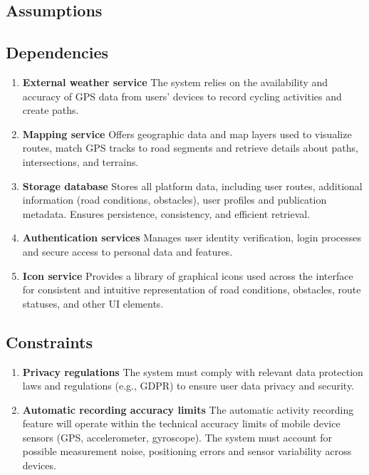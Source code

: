 \subsection{Assumptions}
\subsection{Dependencies}
    \begin{enumerate}[label=D\arabic*.]
        \item \textbf{External weather service} The system relies on the availability and accuracy of GPS data from users' devices to record cycling activities and create paths.
        \item \textbf{Mapping service} Offers geographic data and map layers used to visualize routes, match GPS tracks to road segments and retrieve details about paths, intersections, and terrains.
        \item \textbf{Storage database} Stores all platform data, including user routes, additional information (road conditions, obstacles), user profiles and publication metadata. Ensures persistence, consistency, and efficient retrieval.
        \item \textbf{Authentication services} Manages user identity verification, login processes and secure access to personal data and features.
        \item \textbf{Icon service} Provides a library of graphical icons used across the interface for consistent and intuitive representation of road conditions, obstacles, route statuses, and other UI elements.
    \end{enumerate}
\subsection{Constraints}
    \begin{enumerate}[label=C\arabic*.]
        \item \textbf{Privacy regulations} The system must comply with relevant data protection laws and regulations (e.g., GDPR) to ensure user data privacy and security.
        \item \textbf{Automatic recording accuracy limits} The automatic activity recording feature will operate within the technical accuracy limits of mobile device sensors (GPS, accelerometer, gyroscope). The system must account for possible measurement noise, positioning errors and sensor variability across devices.
    \end{enumerate}

